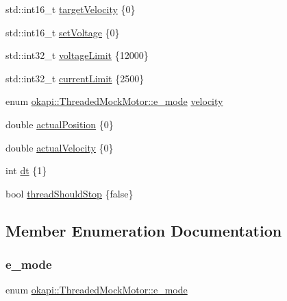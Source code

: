 \begin{DoxyCompactItemize}
\item 
std\+::int16\+\_\+t \mbox{\hyperlink{classokapi_1_1ThreadedMockMotor_aff6bd9eac498c38e6025694e40f33455}{target\+Velocity}} \{0\}
\item 
std\+::int16\+\_\+t \mbox{\hyperlink{classokapi_1_1ThreadedMockMotor_a69e26f6c4ceab552f948b05520315889}{set\+Voltage}} \{0\}
\item 
std\+::int32\+\_\+t \mbox{\hyperlink{classokapi_1_1ThreadedMockMotor_a2b5cfb0ad0be5bc27d63d6969c9906bd}{voltage\+Limit}} \{12000\}
\item 
std\+::int32\+\_\+t \mbox{\hyperlink{classokapi_1_1ThreadedMockMotor_a969e78b369e2fddfccb961c37a55176d}{current\+Limit}} \{2500\}
\item 
enum \mbox{\hyperlink{classokapi_1_1ThreadedMockMotor_a3124c100c1cd16b1d123745ab9af4291}{okapi\+::\+Threaded\+Mock\+Motor\+::e\+\_\+mode}} \mbox{\hyperlink{classokapi_1_1ThreadedMockMotor_a04b2c89303519e55f6e9c89f586a8ec2}{velocity}}
\item 
double \mbox{\hyperlink{classokapi_1_1ThreadedMockMotor_adf8c3cccf3e9dd054f4772eaa32af7b5}{actual\+Position}} \{0\}
\item 
double \mbox{\hyperlink{classokapi_1_1ThreadedMockMotor_a215bba832fd2089c4728ce20373e1873}{actual\+Velocity}} \{0\}
\item 
int \mbox{\hyperlink{classokapi_1_1ThreadedMockMotor_a6023f3d494ccfe461accd28cc7218041}{dt}} \{1\}
\item 
bool \mbox{\hyperlink{classokapi_1_1ThreadedMockMotor_a49078f5fd344815068d72b3b04ca8427}{thread\+Should\+Stop}} \{false\}
\end{DoxyCompactItemize}


\subsection{Member Enumeration Documentation}
\mbox{\label{classokapi_1_1ThreadedMockMotor_a3124c100c1cd16b1d123745ab9af4291}} 
\subsubsection{\texorpdfstring{e\_mode}{e\_mode}}
{\footnotesize\ttfamily enum \mbox{\hyperlink{classokapi_1_1ThreadedMockMotor_a3124c100c1cd16b1d123745ab9af4291}{okapi\+::\+Threaded\+Mock\+Motor\+::e\+\_\+mode}}}

